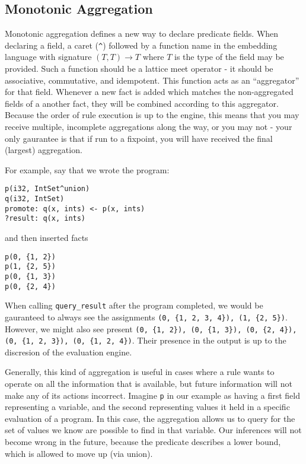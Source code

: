 \subsection{Monotonic Aggregation}
Monotonic aggregation defines a new way to declare predicate fields.
When declaring a field, a caret (\texttt{\^{}}) followed by a function name in the embedding language with signature $(T, T) \rightarrow T$ where $T$ is the type of the field may be provided.
Such a function should be a lattice meet operator - it should be associative, commutative, and idempotent.
This function acts as an ``aggregator'' for that field.
Whenever a new fact is added which matches the non-aggregated fields of a another fact, they will be combined according to this aggregator.
Because the order of rule execution is up to the engine, this means that you may receive multiple, incomplete aggregations along the way, or you may not - your only gaurantee is that if run to a fixpoint, you will have received the final (largest) aggregation.

For example, say that we wrote the program:
\begin{verbatim}
p(i32, IntSet^union)
q(i32, IntSet)
promote: q(x, ints) <- p(x, ints)
?result: q(x, ints)
\end{verbatim}
and then inserted facts
\begin{verbatim}
p(0, {1, 2})
p(1, {2, 5})
p(0, {1, 3})
p(0, {2, 4})
\end{verbatim}

When calling \texttt{query\_result} after the program completed, we would be gauranteed to always see the assignments \texttt{(0, \{1, 2, 3, 4\}), (1, \{2, 5\})}.
However, we might also see present \texttt{(0, \{1, 2\}), (0, \{1, 3\}), (0, \{2, 4\}), (0, \{1, 2, 3\}), (0, \{1, 2, 4\})}.
Their presence in the output is up to the discresion of the evaluation engine.

Generally, this kind of aggregation is useful in cases where a rule wants to operate on all the information that is available, but future information will not make any of its actions incorrect.
Imagine \texttt{p} in our example as having a first field representing a variable, and the second representing values it held in a specific evaluation of a program.
In this case, the aggregation allows us to query for the set of values we know are possible to find in that variable.
Our inferences will not become wrong in the future, because the predicate describes a lower bound, which is allowed to move up (via union).
